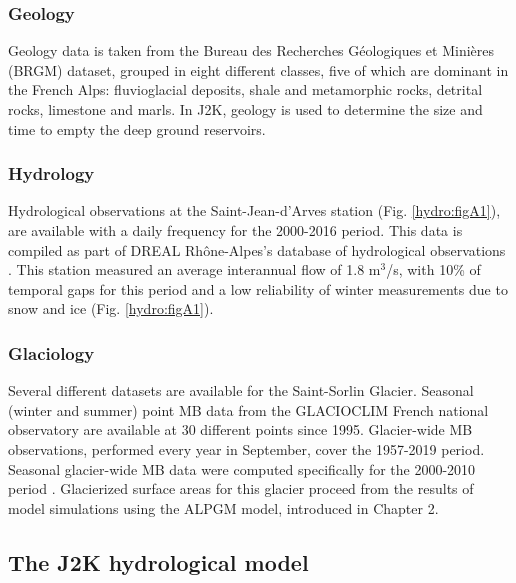 \subsubsection{Geology}

Geology data is taken from the Bureau des Recherches Géologiques et Minières (BRGM) dataset, grouped in eight different classes, five of which are dominant in the French Alps: fluvioglacial deposits, shale and metamorphic rocks, detrital rocks, limestone and marls. In J2K, geology is used to determine the size and time to empty the deep ground reservoirs. 

\subsubsection{Hydrology}

Hydrological observations at the Saint-Jean-d'Arves station (Fig. \ref{hydro:figA1}), are available with a daily frequency for the 2000-2016 period. This data is compiled as part of DREAL Rhône-Alpes's database of hydrological observations \citep{brigode_summary_2020}. This station measured an average interannual flow of 1.8 m$^{3}$/s, with 10\% of temporal gaps for this period and a low reliability of winter measurements due to snow and ice (Fig. \ref{hydro:figA1}).

\subsubsection{Glaciology}

Several different datasets are available for the Saint-Sorlin Glacier. Seasonal (winter and summer) point MB data from the GLACIOCLIM French national observatory are available at 30 different points since 1995. Glacier-wide MB observations, performed every year in September, cover the 1957-2019 period. Seasonal glacier-wide MB data were computed specifically for the 2000-2010 period \citep{davaze_monitoring_2018}. Glacierized surface areas for this glacier proceed from the results of model simulations using the ALPGM model, introduced in Chapter 2. 

\subsection{The J2K hydrological model}

